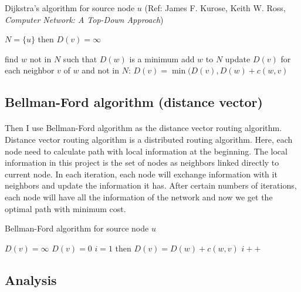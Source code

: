 \documentclass[12pt]{article}
\begin{document}
\begin{algorithm}
\caption{Dijkstra's algorithm for source node $u$ (Ref: James F. Kurose, Keith W. Ross, \textit{Computer Network: A Top-Down Approach}) \cite{kurose2005computer}}\label{alg1}
\begin{algorithmic}[1]
\State $N=\{u\}$
\State then $D(v)=\infty$ 
\EndIf 
\EndFor

\State find $w$ not in $N$ such that $D(w)$ is a minimum
\State add $w$ to $N$
\State update $D(v)$ for each neighbor $v$ of $w$ and not in $N$:
\State $D(v)=\min(D(v),D(w)+c(w,v)$
\EndWhile

\end{algorithmic}
\end{algorithm}

\subsection{Bellman-Ford algorithm (distance vector)}
\paragraph{}
Then I use Bellman-Ford algorithm as the distance vector routing algorithm. Distance vector routing algorithm is a distributed routing algorithm. 
Here, each node need to calculate path with local information at the beginning. The local information in this project is the set of nodes as neighbors linked directly to current node. 
In each iteration, each node will exchange information with it neighbors and update the information it has. 
After certain numbers of iterations, each node will have all the information of the network and now we get the optimal path with minimum cost. 

\begin{algorithm}
\caption{Bellman-Ford algorithm for source node $u$}\label{alg2}
\begin{algorithmic}[1]
\State $D(v)=\infty$
\Else
\State $D(v)=0$
\EndIf
\EndFor
\State $i=1$
\State then $D(v)=D(w)+c(w,v)$ 
\EndIf 
\EndFor
\State $i++$
\EndFor
\end{algorithmic}
\end{algorithm}

\subsection{Analysis}
\end{document}
